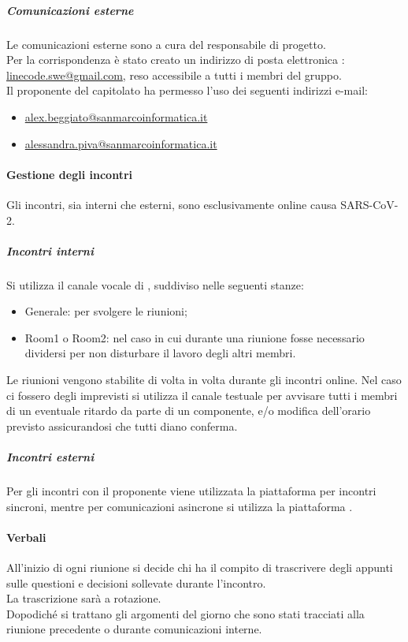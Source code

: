     		\subparagraph{Comunicazioni esterne}
    		Le comunicazioni esterne sono a cura del responsabile di progetto. \\
    		Per la corrispondenza è stato creato un indirizzo di posta elettronica : \url{linecode.swe@gmail.com}, reso accessibile a tutti i membri del gruppo.\\
    		Il proponente del capitolato ha  permesso l'uso dei seguenti indirizzi e-mail:
    		\begin{itemize}
    		    \item \url{alex.beggiato@sanmarcoinformatica.it}
    		 	\item \url{alessandra.piva@sanmarcoinformatica.it}
    		\end{itemize}

        \paragraph{Gestione degli incontri}
        Gli incontri, sia interni che esterni, sono esclusivamente online causa SARS-CoV-2.

            \subparagraph{Incontri interni}
            Si utilizza il canale vocale di , suddiviso nelle seguenti stanze:
            \begin{itemize}
                \item {\sffamily Generale}: per svolgere le riunioni;
                \item {\sffamily Room1} o {\sffamily Room2}: nel caso in cui durante una riunione fosse necessario dividersi per non disturbare il lavoro degli altri membri.
            \end{itemize}
            Le riunioni vengono stabilite di volta in volta durante gli incontri online.
            Nel caso ci fossero degli imprevisti si utilizza il canale testuale per avvisare tutti i membri di un eventuale ritardo da parte di un componente, e/o modifica dell'orario previsto assicurandosi che tutti diano conferma.

            \subparagraph{Incontri esterni}
            Per gli incontri con il proponente viene utilizzata la piattaforma  per incontri sincroni, mentre per comunicazioni asincrone si utilizza la piattaforma .

		\paragraph{Verbali}
        All'inizio di ogni riunione si decide chi ha il compito di trascrivere degli appunti sulle questioni e decisioni sollevate durante l'incontro. \\
        La trascrizione sarà a rotazione.\\
        Dopodiché si trattano gli argomenti del giorno che sono stati tracciati alla riunione precedente o durante comunicazioni interne.

